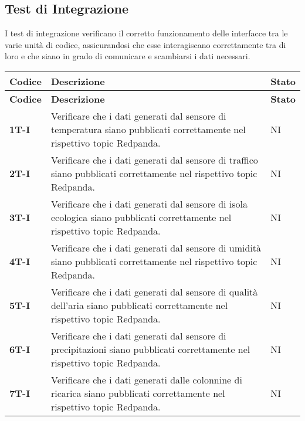 \subsection{Test di Integrazione}
I test di integrazione verificano il corretto funzionamento delle interfacce tra le varie unità di codice,
assicurandosi che esse interagiscano correttamente tra di loro e che siano in grado di comunicare e scambiarsi i dati necessari. \\
\begin{longtable}{|>{\raggedright\arraybackslash}m{}|>{\raggedright\arraybackslash}m{}|>{\raggedright\arraybackslash}m{}|}
	\hline
	\textbf{Codice} & \textbf{Descrizione}                                                                                                                 & \textbf{Stato} \\
	\hline
	\endfirsthead
	\hline
	\textbf{Codice} & \textbf{Descrizione}                                                                                                                 & \textbf{Stato} \\
	\endhead
	\textbf{1T-I}   & Verificare che i dati generati dal sensore di temperatura siano pubblicati correttamente nel rispettivo topic Redpanda.              & NI             \\
	\hline
	\textbf{2T-I}   & Verificare che i dati generati dal sensore di traffico siano pubblicati correttamente nel rispettivo topic Redpanda.                 & NI             \\
	\hline
	\textbf{3T-I}   & Verificare che i dati generati dal sensore di isola ecologica siano pubblicati correttamente nel rispettivo topic Redpanda.          & NI             \\
	\hline
	\textbf{4T-I}   & Verificare che i dati generati dal sensore di umidità siano pubblicati correttamente nel rispettivo topic Redpanda.                  & NI             \\
	\hline
	\textbf{5T-I}   & Verificare che i dati generati dal sensore di qualità dell'aria siano pubblicati correttamente nel rispettivo topic Redpanda.        & NI             \\
	\hline
	\textbf{6T-I}   & Verificare che i dati generati dal sensore di precipitazioni siano pubblicati correttamente nel rispettivo topic Redpanda.           & NI             \\
	\hline
	\textbf{7T-I}   & Verificare che i dati generati dalle colonnine di ricarica siano pubblicati correttamente nel rispettivo topic Redpanda.             & NI             \\

\end{longtable}
